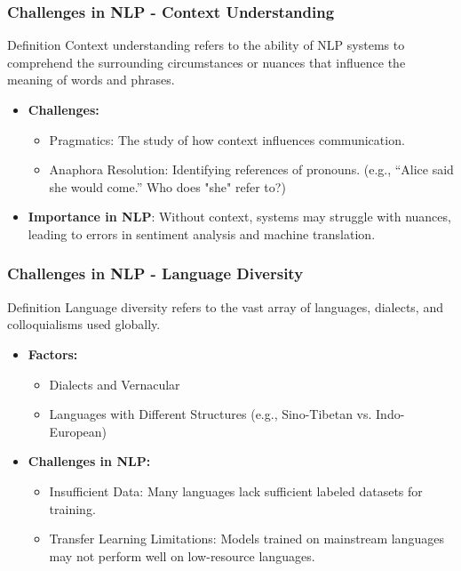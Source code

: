 \documentclass[aspectratio=169]{beamer}
\begin{document}
\begin{frame}[fragile]
    \frametitle{Challenges in NLP - Context Understanding}
    \begin{block}{Definition}
        Context understanding refers to the ability of NLP systems to comprehend the surrounding circumstances or nuances that influence the meaning of words and phrases.
    \end{block}
    
    \begin{itemize}
        \item \textbf{Challenges:}
        \begin{itemize}
            \item Pragmatics: The study of how context influences communication.
            \item Anaphora Resolution: Identifying references of pronouns. (e.g., “Alice said she would come.” Who does "she" refer to?)
        \end{itemize}
        \item \textbf{Importance in NLP}: Without context, systems may struggle with nuances, leading to errors in sentiment analysis and machine translation.
    \end{itemize}
\end{frame}

\begin{frame}[fragile]
    \frametitle{Challenges in NLP - Language Diversity}
    \begin{block}{Definition}
        Language diversity refers to the vast array of languages, dialects, and colloquialisms used globally.
    \end{block}
    
    \begin{itemize}
        \item \textbf{Factors:}
        \begin{itemize}
            \item Dialects and Vernacular
            \item Languages with Different Structures (e.g., Sino-Tibetan vs. Indo-European)
        \end{itemize}
        
        \item \textbf{Challenges in NLP:}
        \begin{itemize}
            \item Insufficient Data: Many languages lack sufficient labeled datasets for training.
            \item Transfer Learning Limitations: Models trained on mainstream languages may not perform well on low-resource languages.
        \end{itemize}
    \end{itemize}
\end{frame}
\end{document}
